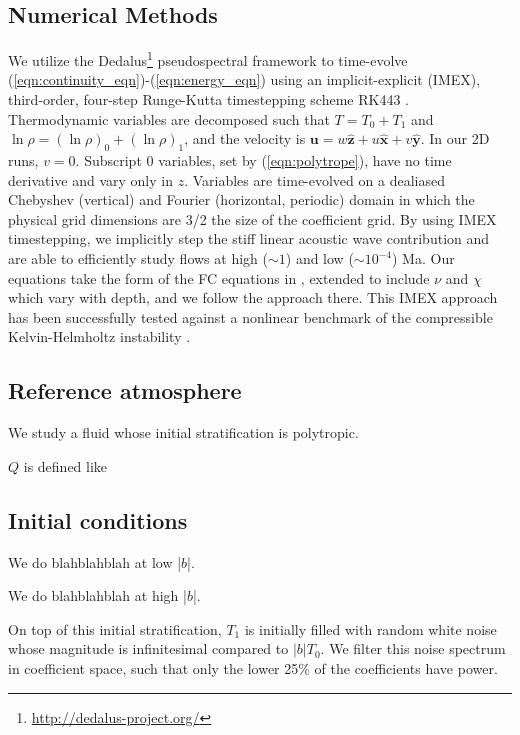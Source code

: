 \documentclass[twocolumn, amsmath, amsfonts, amssymb]{aastex62}
\begin{document}
\subsection{Numerical Methods}
We utilize the 
Dedalus\footnote{\url{http://dedalus-project.org/}} 
pseudospectral framework \cite{burns&all2016} to time-evolve  
(\ref{eqn:continuity_eqn})-(\ref{eqn:energy_eqn}) 
using an implicit-explicit (IMEX), third-order, four-step 
Runge-Kutta timestepping scheme RK443 \cite{ascher&all1997}.  
Thermodynamic variables are decomposed such that $T = T_0 + T_1$ and
$\ln\rho = (\ln\rho)_0 + (\ln\rho)_1$, 
and the velocity is $\bm{u} = w\bm{\hat{z}} + u\bm{\hat{x}} + v\bm{\hat{y}}$.
In our 2D runs, $v = 0$.
Subscript 0 variables, set by (\ref{eqn:polytrope}), 
have no time derivative and vary only in $z$.
Variables are time-evolved on a dealiased Chebyshev (vertical)
and Fourier (horizontal, periodic) domain in which the
physical grid dimensions are 3/2 the size of the coefficient grid.  
By using IMEX timestepping, we implicitly step the 
stiff linear acoustic wave contribution and are able to
efficiently study flows at high ($\sim 1$) 
and low ($\sim 10^{-4}$) Ma.  Our equations take the form
of the FC equations in \cite{lecoanet&all2014}, extended to include
$\nu$ and $\chi$ which vary with depth, and we follow the approach there.
This IMEX approach has been successfully 
tested against a nonlinear benchmark  of the compressible 
Kelvin-Helmholtz instability \cite{Lecoanet_et_al_2016_KH}.

\subsection{Reference atmosphere}
\label{sec:atmosphere}
We study a fluid whose initial stratification is polytropic.

$Q$ is defined like 


\subsection{Initial conditions}
We do blahblahblah at low |$b$|.

We do blahblahblah at high |$b$|.

On top of this initial stratification, $T_1$ is initially filled with
random white noise whose magnitude is infinitesimal
compared to $|b| T_0$.
We filter this noise spectrum in coefficient space, 
such that only the lower 25\% of the coefficients
have power. 
\end{document}
